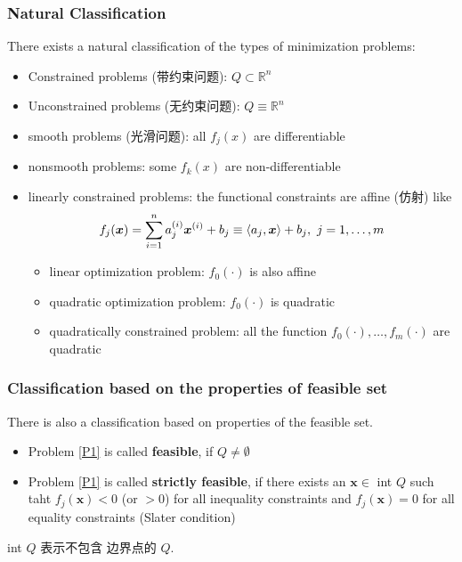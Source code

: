 \subsubsection{Natural Classification}
There exists a natural classification of the types of minimization problems:
\begin{itemize}\small
    \item Constrained problems (带约束问题): $Q\subset \mathbb{R}^n$
    \item Unconstrained problems (无约束问题): $Q\equiv \mathbb{R}^n$
    \item smooth problems (光滑问题): all $f_j(x)$ are differentiable
    \item nonsmooth problems: some $f_k(x)$ are non-differentiable
    \item linearly constrained problems: the functional constraints are affine (仿射) like
    \begin{align*}
        f_j(\bm{x})=\sum_{i=1}^n a_j^{(i)}\bm x^{(i)}+b_j\equiv\braket{a_j,\bm x}+b_j,\ j=1,\dots,m
    \end{align*}
    \begin{itemize}
        \item linear optimization problem: $f_0(\cdot)$ is also affine
        \item quadratic optimization problem: $f_0(\cdot)$ is quadratic
        \item quadratically constrained problem: all the function $f_0(\cdot),\dots,f_m(\cdot)$ are quadratic
    \end{itemize}
\end{itemize}

\subsubsection{Classification based on the properties of feasible set}
There is also a classification based on properties of the feasible set. 
\begin{itemize}
    \item Problem \ref{P1} is called \textbf{feasible}, if $Q\ne \emptyset$
    \item Problem \ref{P1} is called \textbf{strictly feasible}, if there exists an $\bm x \in $ int $Q$ such taht $f_j(\bm x)<0$ (or $>0$) for all inequality constraints and $f_j(\bm x)=0$ for all equality constraints (Slater condition)
\end{itemize}
int $Q$ 表示不包含 边界点的 $Q$.

